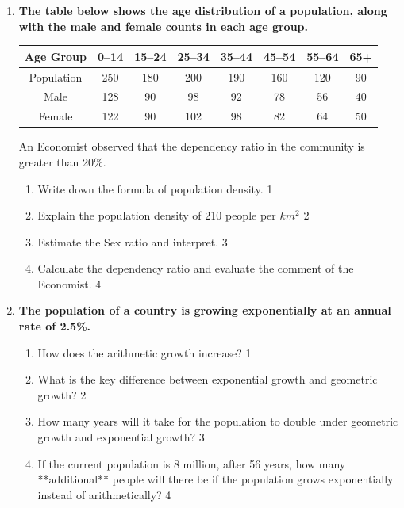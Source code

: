 \documentclass[a4paper,oneside, margin=1.4in]{book}
\begin{document}
  \begin{enumerate}
  
 \item
  \textbf{The table below shows the age distribution of a population, along with the male and female counts in each age group.}

\begin{table}[h]
\centering
\begin{tabular}{c|c|c|c|c|c|c|c}
Age Group  & 0–14 & 15–24 & 25–34 & 35–44 & 45–54 & 55–64 & 65+ \\ \hline
Population & 250  & 180   & 200   & 190   & 160   & 120   & 90  \\ \hline
Male       & 128  & 90    & 98    & 92    & 78    & 56    & 40  \\
Female     & 122  & 90    & 102   & 98    & 82    & 64    & 50 
\end{tabular}
\end{table}

An Economist observed that the dependency ratio in the community is greater than 20\%.
  
  \begin{enumerate}
    \item
	Write down the formula of population density. \hfill 1
    \item
	Explain the population density of 210 people per $km^2$ \hfill 2
    \item  
	Estimate the Sex ratio and interpret. \hfill 3
    \item
	Calculate the dependency ratio and evaluate the comment of the Economist. \hfill 4
  \end{enumerate}

 \item
  \textbf{The population of a country is growing exponentially at an annual rate of 2.5\%.}

  
  \begin{enumerate}
    \item
	How does the arithmetic growth increase? \hfill 1
    \item
    What is the key difference between exponential growth and geometric growth? \hfill 2
  \item
How many years will it take for the population to double under geometric growth and exponential growth? \hfill 3

\item
If the current population is 8 million, after 56 years, how many **additional** people will there be if the population grows exponentially instead of arithmetically? \hfill 4
  \end{enumerate}

  \end{enumerate}  
  
\end{document}
